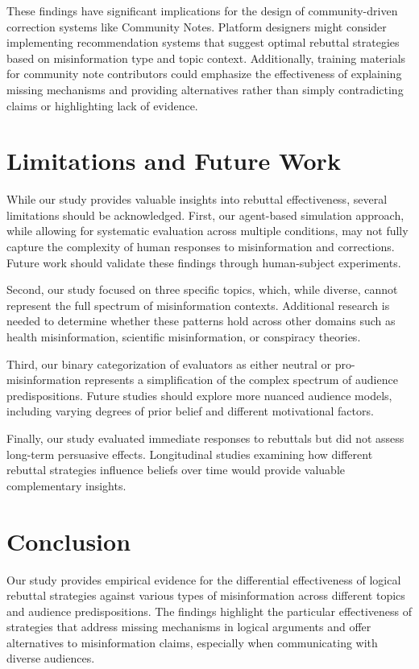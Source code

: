\documentclass[twocolumn]{article}
\begin{document}
These findings have significant implications for the design of community-driven correction systems like Community Notes. Platform designers might consider implementing recommendation systems that suggest optimal rebuttal strategies based on misinformation type and topic context. Additionally, training materials for community note contributors could emphasize the effectiveness of explaining missing mechanisms and providing alternatives rather than simply contradicting claims or highlighting lack of evidence.

\section{Limitations and Future Work}
While our study provides valuable insights into rebuttal effectiveness, several limitations should be acknowledged. First, our agent-based simulation approach, while allowing for systematic evaluation across multiple conditions, may not fully capture the complexity of human responses to misinformation and corrections. Future work should validate these findings through human-subject experiments.

Second, our study focused on three specific topics, which, while diverse, cannot represent the full spectrum of misinformation contexts. Additional research is needed to determine whether these patterns hold across other domains such as health misinformation, scientific misinformation, or conspiracy theories.

Third, our binary categorization of evaluators as either neutral or pro-misinformation represents a simplification of the complex spectrum of audience predispositions. Future studies should explore more nuanced audience models, including varying degrees of prior belief and different motivational factors.

Finally, our study evaluated immediate responses to rebuttals but did not assess long-term persuasive effects. Longitudinal studies examining how different rebuttal strategies influence beliefs over time would provide valuable complementary insights.

\section{Conclusion}
Our study provides empirical evidence for the differential effectiveness of logical rebuttal strategies against various types of misinformation across different topics and audience predispositions. The findings highlight the particular effectiveness of strategies that address missing mechanisms in logical arguments and offer alternatives to misinformation claims, especially when communicating with diverse audiences.
\end{document}
